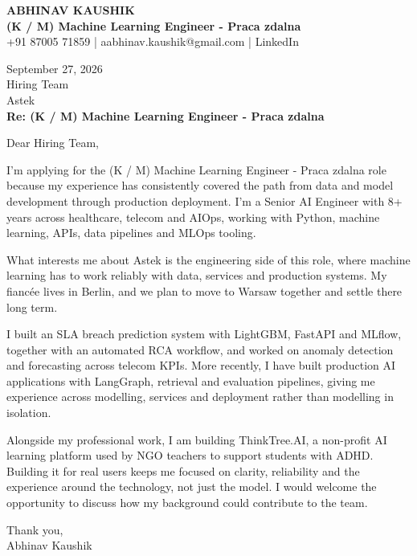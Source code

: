 \documentclass[10pt,a4paper]{article}
\begin{document}
\begin{center}
{\Large\bfseries ABHINAV KAUSHIK}\\[2pt]
{\bfseries (K / M) Machine Learning Engineer - Praca zdalna}\\[2pt]
+91 87005 71859 \quad | \quad aabhinav.kaushik@gmail.com \quad | \quad LinkedIn
\end{center}
\vspace{8pt}
September 27, 2026\\[6pt]
Hiring Team\\
Astek\\[4pt]
\textbf{Re: (K / M) Machine Learning Engineer - Praca zdalna}

Dear Hiring Team,

I’m applying for the (K / M) Machine Learning Engineer - Praca zdalna role because my experience has consistently covered the path from data and model development through production deployment. I’m a Senior AI Engineer with 8+ years across healthcare, telecom and AIOps, working with Python, machine learning, APIs, data pipelines and MLOps tooling.

What interests me about Astek is the engineering side of this role, where machine learning has to work reliably with data, services and production systems. My fiancée lives in Berlin, and we plan to move to Warsaw together and settle there long term.

I built an SLA breach prediction system with LightGBM, FastAPI and MLflow, together with an automated RCA workflow, and worked on anomaly detection and forecasting across telecom KPIs. More recently, I have built production AI applications with LangGraph, retrieval and evaluation pipelines, giving me experience across modelling, services and deployment rather than modelling in isolation.

Alongside my professional work, I am building ThinkTree.AI, a non-profit AI learning platform used by NGO teachers to support students with ADHD. Building it for real users keeps me focused on clarity, reliability and the experience around the technology, not just the model. I would welcome the opportunity to discuss how my background could contribute to the team.

Thank you,\\
Abhinav Kaushik
\end{document}
